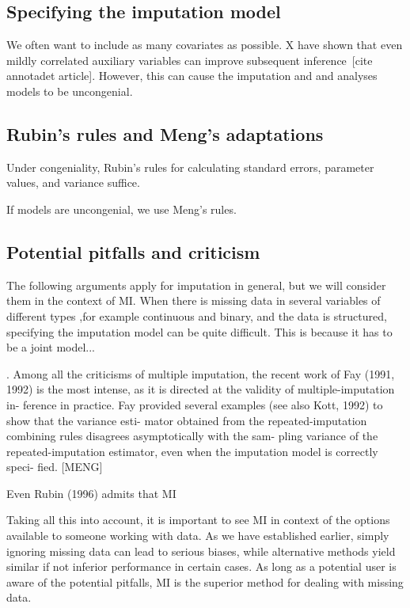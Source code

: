 \documentclass{article}
\begin{document}
	\subsection{Specifying the imputation model}
	
	
	We often want to include as many covariates as possible. X have shown that even mildly correlated auxiliary variables can improve subsequent inference [cite annotadet article]. However, this can cause the imputation and and analyses models to be uncongenial.
	
	\subsection{Rubin's rules and Meng's adaptations}
	
	Under congeniality, Rubin's rules for calculating standard errors, parameter values, and variance suffice.
	
	
	
	If models are uncongenial, we use Meng's rules.
	
	\subsection{Potential pitfalls and criticism}
	The following arguments apply for imputation in general, but we will consider them in the context of MI. When there is missing data in several variables of different types ,for example continuous and binary, and the data is structured, specifying the imputation model can be quite difficult. This is because it has to be a joint model...
	
	
	. Among all the
	criticisms of multiple imputation, the recent work
	of Fay (1991, 1992) is the most intense, as it is
	directed at the validity of multiple-imputation in-
	ference in practice. Fay provided several examples
	(see also Kott, 1992) to show that the variance esti-
	mator obtained from the repeated-imputation combining rules disagrees asymptotically with the sam-
	pling variance of the repeated-imputation estimator,
	even when the imputation model is correctly speci-
	fied. [MENG]
	
	
	Even Rubin (1996) admits that MI
	
	Taking all this into account, it is important to see MI in context of the options available to someone working with data. As we have established earlier, simply ignoring missing data can lead  to serious biases, while alternative methods yield similar if not inferior performance in certain cases. As long as a potential user is aware of the potential pitfalls, MI is the superior method for dealing with missing data.
	
\end{document}
